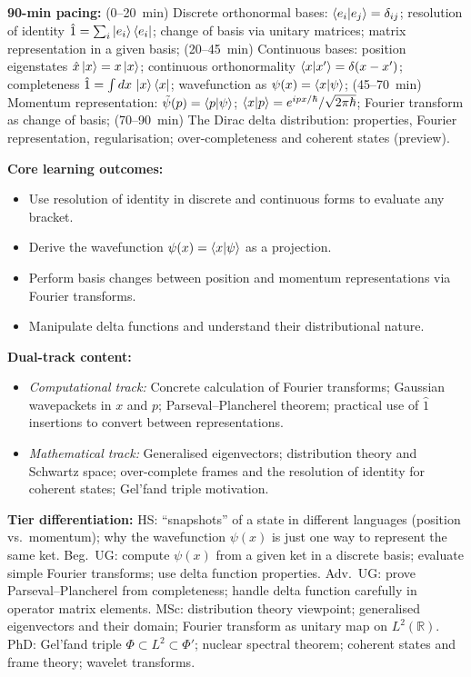 \documentclass[11pt,a4paper]{article}
\begin{document}
\medskip
\begin{tcolorbox}[modulebox, title={Module~I.3 / L02: Bases: Discrete and Continuous}]
\textbf{90-min pacing:} (0--20~min) Discrete orthonormal bases: $\braket{e_i|e_j}=\delta_{ij}$;
resolution of identity $\hat{1}=\sum_i\ket{e_i}\bra{e_i}$;
change of basis via unitary matrices; matrix representation in a given basis;
(20--45~min) Continuous bases: position eigenstates $\hat{x}\ket{x}=x\ket{x}$;
continuous orthonormality $\braket{x|x'}=\delta(x-x')$; completeness
$\hat{1}=\int dx\,\ket{x}\bra{x}$; wavefunction as $\psi(x)=\braket{x|\psi}$;
(45--70~min) Momentum representation: $\tilde{\psi}(p)=\braket{p|\psi}$;
$\braket{x|p}=e^{ipx/\hbar}/\sqrt{2\pi\hbar}$; Fourier transform as change of basis;
(70--90~min) The Dirac delta distribution: properties, Fourier representation,
regularisation; over-completeness and coherent states (preview).

\medskip\textbf{Core learning outcomes:}
\begin{itemize}[leftmargin=1.4em,topsep=2pt,itemsep=1pt]
  \item Use resolution of identity in discrete and continuous forms to evaluate any bracket.
  \item Derive the wavefunction $\psi(x)=\braket{x|\psi}$ as a projection.
  \item Perform basis changes between position and momentum representations via Fourier transforms.
  \item Manipulate delta functions and understand their distributional nature.
\end{itemize}

\medskip\textbf{Dual-track content:}
\begin{itemize}[leftmargin=1.4em,topsep=2pt,itemsep=1pt]
  \item \textit{Computational track:} Concrete calculation of Fourier transforms;
    Gaussian wavepackets in $x$ and $p$; Parseval--Plancherel theorem;
    practical use of $\hat{1}$ insertions to convert between representations.
  \item \textit{Mathematical track:} Generalised eigenvectors; distribution theory
    and Schwartz space; over-complete frames and the resolution of identity for
    coherent states; Gel'fand triple motivation.
\end{itemize}

\medskip\textbf{Tier differentiation:}
HS: ``snapshots'' of a state in different languages (position vs.\ momentum);
why the wavefunction $\psi(x)$ is just one way to represent the same ket.
Beg.\ UG: compute $\psi(x)$ from a given ket in a discrete basis; evaluate simple
Fourier transforms; use delta function properties.
Adv.\ UG: prove Parseval--Plancherel from completeness; handle delta function
carefully in operator matrix elements.
MSc: distribution theory viewpoint; generalised eigenvectors and their domain;
Fourier transform as unitary map on $L^2(\mathbb{R})$.
PhD: Gel'fand triple $\Phi\subset L^2\subset\Phi'$; nuclear spectral theorem;
coherent states and frame theory; wavelet transforms.


\end{tcolorbox}
\end{document}
